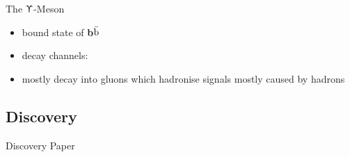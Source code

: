 \begin{frame}{The $\Upupsilon$-Meson}
 
	\begin{itemize}
		\item bound state of \textbf{b$\bar{\text{b}}$}\vspace*{10pt}
		\item decay channels:
	\end{itemize}
	\begin{figure}
	\end{figure}
	\begin{itemize}
		\item mostly decay into gluons which hadronise \ra signals mostly caused by hadrons
	\end{itemize}

\end{frame}


\subsection{Discovery}
\begin{frame}{Discovery Paper}

	
\end{frame}

